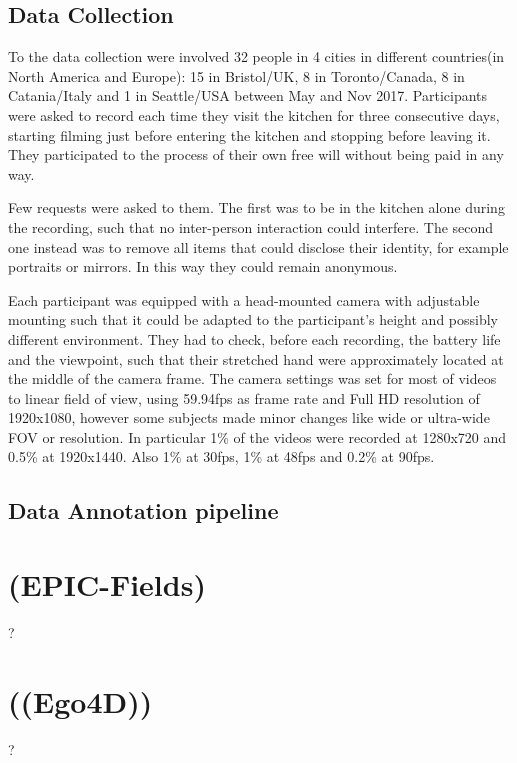 

\subsection{Data Collection}
To the data collection were involved 32 people in 4 cities in different
countries(in North America and Europe): 15 in Bristol/UK, 8 in Toronto/Canada,
8 in Catania/Italy and 1 in Seattle/USA between May and Nov 2017. Participants
were asked to record each time they visit the kitchen for three consecutive days,
starting filming just before entering the kitchen and stopping before leaving it.
They participated to the process of their own free will without being paid in any way.


Few requests were asked to them. The first was to be in the kitchen alone during
the recording, such that no inter-person interaction could interfere.  The
second one instead was to remove all items that could disclose their identity, for
example portraits or mirrors. In this way they could remain anonymous.

Each participant was equipped with a head-mounted camera with adjustable mounting
such that it could be adapted to the participant's height and possibly different 
environment. They had to check, before each recording, the battery life and the viewpoint,
such that their stretched hand were approximately located at the middle of the 
camera frame.
The camera settings was set for most of videos to linear field of view, using 
59.94fps as frame rate and Full HD resolution of 1920x1080, however some 
subjects made minor changes like wide or ultra-wide FOV or resolution.
In particular 1\% of the videos were recorded at 1280x720 and 0.5\% at 1920x1440.
Also 1\% at 30fps, 1\% at 48fps and 0.2\% at 90fps.
\subsection{Data Annotation pipeline}

\section{(EPIC-Fields)}
?
\section{((Ego4D))}
?
